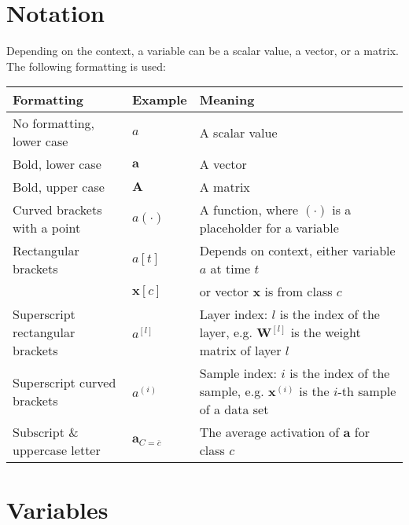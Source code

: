 

\section{Notation}

Depending on the context, a variable can be a scalar value, a vector, or a matrix. The following formatting is used:

\begin{tabular}{ p{5cm} p{2cm} p{7cm} }
	\textbf{Formatting} & \textbf{Example} & \textbf{Meaning}\\
	\hline
  	No formatting, lower case & $a$ & A scalar value\\
  	Bold, lower case & $\boldsymbol{a}$ & A vector\\
  	Bold, upper case & $\boldsymbol{A}$ & A matrix\\
  	Curved brackets with a point & $a(\cdot)$ & A function, where $(\cdot)$ is a placeholder for a variable\\
  	Rectangular brackets    & $a[t]$ & Depends on context, either variable $a$ at time $t$\\
							& $\boldsymbol{x}[c]$ & or vector $\boldsymbol{x}$ is from class $c$\\
  	Superscript rectangular brackets & $a^{[l]}$ & Layer index: $l$ is the index of the layer, e.g. $\boldsymbol{W}^{[l]}$ is the weight matrix of layer $l$\\
  	Superscript curved brackets & $a^{(i)}$ & Sample index: $i$ is the index of the sample, e.g. $\boldsymbol{x}^{(i)}$ is the $i$-th sample of a data set\\
  	Subscript \& uppercase letter & $\boldsymbol{a}_{C=\overline{c}}$ & The average activation of $\boldsymbol{a}$ for class $c$\\
\end{tabular}


\section{Variables}



